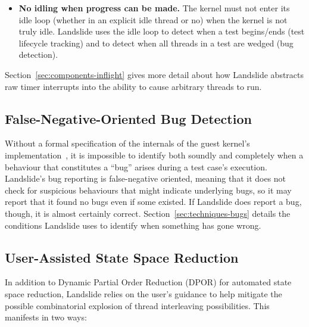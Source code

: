 {\begin{itemize}
	Landslide treats the sleep queue no differently from the runqueue when deciding which threads are runnable. The guest kernel will treat it differently, but since sleeping for a predetermined amount of time is never an appropriate way to solve race conditions, Landslide treats sleeping threads as notionally runnable. This fits directly into its model that runnable threads are ones that can be caused to run with a finite number of timer ticks in succession.
	\item {\bf No idling when progress can be made.} The kernel must not enter its idle loop (whether in an explicit idle thread or no) when the kernel is not truly idle. Landslide uses the idle loop to detect when a test begins/ends (test lifecycle tracking) and to detect when all threads in a test are wedged (bug detection).
\end{itemize}

Section~\ref{sec:components-inflight} gives more detail about how Landslide abstracts raw timer interrupts into the ability to cause arbitrary threads to run.

\subsection{False-Negative-Oriented Bug Detection}
\label{sec:model-bugs}

Without a formal specification of the internals of the guest kernel's implementation~\cite{sel4}, it is impossible to identify both soundly and completely when a behaviour that constitutes a ``bug'' arises during a test case's execution.
Landslide's bug reporting is false-negative oriented, meaning that it does not check for suspicious behaviours that might indicate underlying bugs, so it may report that it found no bugs even if some existed. If Landslide does report a bug, though, it is almost certainly correct. Section~\ref{sec:techniques-bugs} details the conditions Landslide uses to identify when something has gone wrong.

\subsection{User-Assisted State Space Reduction}
\label{sec:model-user}

In addition to Dynamic Partial Order Reduction (DPOR) for automated state space reduction, Landslide relies on the user's guidance to help mitigate the possible combinatorial explosion of thread interleaving possibilities. This manifests in two ways:

}
